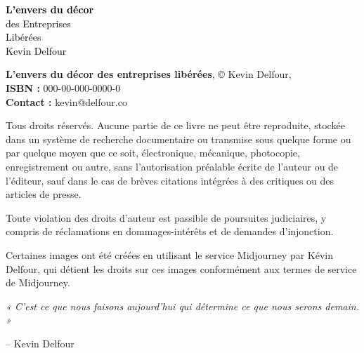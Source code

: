 \newpage{}
\thispagestyle {empty}
\begin{titlepage}
    \centering
    \vspace*{3cm}
    {\fontsize{\titlepageBig}{48}\selectfont \textcolor{black}{\textbf{L'envers du décor}}}\\[0.5cm]
    {\fontsize{\titlepageMid}{40}\selectfont \textcolor{black}{des Entreprises}}\\[0.25cm]
    {\fontsize{\titlepageBig}{48}\selectfont \textcolor{black}{Libérées}}\\[2cm]
    {\fontsize{12}{19.2}\selectfont \textcolor{black}{Kevin Delfour}}\\[3pt]
    \vfill
\end{titlepage}

\newpage{}
\thispagestyle {empty}
\vspace*{\fill}

\begin{flushleft}

    \textbf{L'envers du décor des entreprises libérées}, © Kevin Delfour, \edition \\[0.25cm]
    \textbf{ISBN : } 000-00-000-0000-0 \\[0.25cm]
    \textbf{Contact : } kevin@delfour.co

    \noindent Tous droits réservés. Aucune partie de ce livre ne peut être reproduite, stockée dans un système de recherche documentaire ou transmise sous quelque forme ou par quelque moyen que ce soit, électronique, mécanique, photocopie, enregistrement ou autre, sans l'autorisation préalable écrite de l'auteur ou de l'éditeur, sauf dans le cas de brèves citations intégrées à des critiques ou des articles de presse.

    Toute violation des droits d'auteur est passible de poursuites judiciaires, y compris de réclamations en dommages-intérêts et de demandes d'injonction.

    Certaines images ont été créées en utilisant le service Midjourney par Kévin Delfour, qui détient les droits sur ces images conformément aux termes de service de Midjourney.

\end{flushleft}

\newpage{}
\thispagestyle {empty}

\vspace*{2cm}

\begin{center}
    \vspace*{\fill}
    \parbox{0.85\textwidth}{
        \begin{center}
            \large{\selectfont
                \textit{« C'est ce que nous faisons aujourd'hui qui détermine ce que nous serons demain. »}
            }

            \vspace{.5cm}\hfill{-- Kevin Delfour}
        \end{center}
    }
    \vspace*{\fill}
\end{center}

\newpage
\thispagestyle{empty} %
\mbox{}

